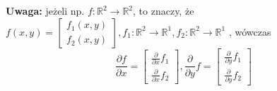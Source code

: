 \documentclass[../main.tex]{subfiles}
\begin{document}
\begin{przyklad}

\textbf{Uwaga:} jeżeli np. $f: \mathbb{R}^{2} \to \mathbb{R}^{2}$, to znaczy, że\\
$f(x,y) =
\left [
\begin{matrix}
    f_1 (x,y)\\
    f_2 (x,y)
\end{matrix}
\right ], f_1 : \mathbb{R}^{2} \to \mathbb{R}^{1}, f_2 : \mathbb{R}^{2} \to \mathbb{R}^{1}$
, wówczas
\[
    \frac{\partial f}{\partial x} =
    \left [
        \begin{matrix}
            \frac{\partial}{\partial x} f_1 \\
            \frac{\partial}{\partial x} f_2
        \end{matrix}
    \right ],
    \frac{\partial}{\partial y} f =
    \left [
        \begin{matrix}
            \frac{\partial}{\partial y} f_1 \\
            \frac{\partial}{\partial y} f_2
        \end{matrix}
    \right ]
\]
\end{przyklad}
\end{document}
